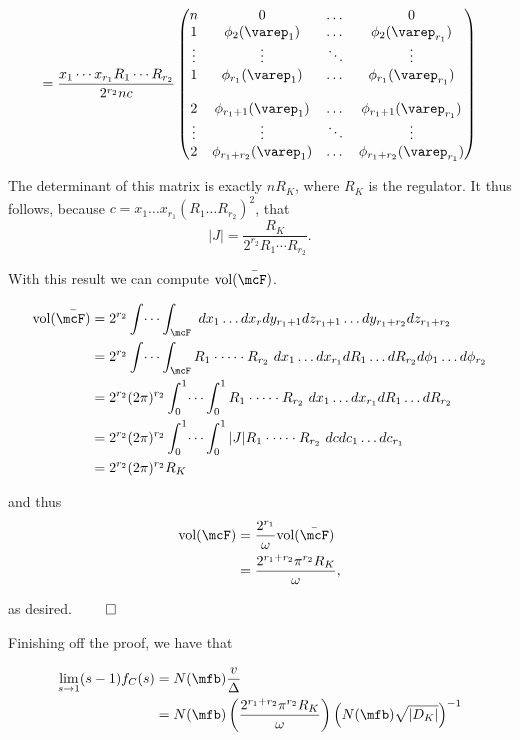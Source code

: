 \documentclass[a4paper, 12pt,oneside,openany]{book}
\begin{document}
$$=\frac{x_1\cdots x_{r_1} R_1 \cdots R_{r_2}}{2^{r_2} nc}\begin{pmatrix}
        n & 0 & \dots & 0 \\
        1 & \phi_2(\varep_1) & \dots & \phi_2(\varep_{r_1}) \\
        \vdots & \vdots & \ddots & \vdots \\
        1 & \phi_{r_1}(\varep_1) & \dots & \phi_{r_1}(\varep_{r_1}) \\ \\
        2 &  \phi_{r_1+1}(\varep_1) & \dots & \phi_{r_1+1}(\varep_{r_1}) \\
        \vdots & \vdots & \ddots & \vdots \\
        2 & \phi_{r_1+r_2}(\varep_1) & \dots &  \phi_{r_1+r_2}(\varep_{r_1}) 
   	\end{pmatrix}$$
	
The determinant of this matrix is exactly $nR_K$, where $R_K$ is the regulator. It thus follows, because $c = x_1\dots x_{r_1}(R_1\dots R_{r_2})^2$, that $$|J|=\frac{R_K}{2^{r_2} R_1 \cdots R_{r_2}}.$$

With this result we can compute $\text{vol}(\bar{\mcF)}$.

\begin{align*}
	\text{vol}(\bar{\mcF)}&= 2^{r_2} \int \dots \int_{\mcF} \ dx_1\dots dx_r dy_{r_1+1}dz_{r_1+1}\dots dy_{r_1+r_2} dz_{r_1+r_2} \\
	&= 2^{r_2} \int \dots \int_{\mcF} R_1\cdot \dots\cdot R_{r_2}\ dx_1\dots dx_{r_1} dR_1\dots dR_{r_2} d\phi_1\dots d\phi_{r_2} \\
	&= 2^{r_2} (2\pi)^{r_2} \int_{0}^1 \dots \int_{0}^1 R_1\cdot \dots\cdot R_{r_2}\ dx_1\dots dx_{r_1}dR_1\dots dR_{r_2} \\
	&= 2^{r_2} (2\pi)^{r_2} \int_{0}^1 \dots \int_{0}^1 |J| R_1\cdot \dots\cdot R_{r_2}\ dc dc_1 \dots dc_{r_1} \\
	&= 2^{r_2} (2\pi)^{r_2} R_K
\end{align*}

and thus \begin{align*}
	\text{vol}(\mcF) &= \frac{2^{r_1}}{\omega} \text{vol}(\bar{\mcF}) \\
	&= \frac{2^{r_1+r_2}\pi^{r_2}R_K}{\omega},
\end{align*}

as desired. $\qed$
	
Finishing off the proof, we have that 

\begin{align*} 
	\lim\limits_{s\to 1} (s-1) f_C(s) &= N(\mfb)\frac{v}{\Delta} \\
	&= N(\mfb) \left(\frac{2^{r_1+r_2}\pi^{r_2} R_K}{\omega}\right) \left(N(\mfb)\sqrt{|D_K|}\right)^{-1}
\end{align*}
\end{document}
